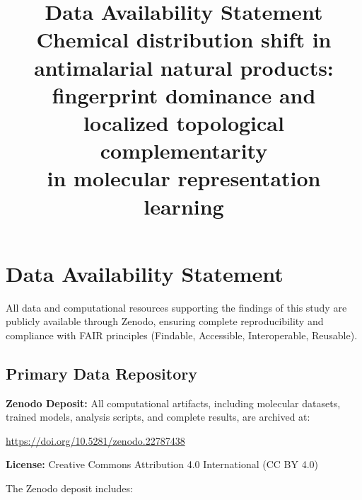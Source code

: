 \documentclass[11pt,a4paper]{article}
\title{Data Availability Statement\\[0.5em]
\large Chemical distribution shift in antimalarial natural products:\\
fingerprint dominance and localized topological complementarity\\
in molecular representation learning}
\author{}
\date{}
\begin{document}
\maketitle

\section*{Data Availability Statement}

All data and computational resources supporting the findings of this study are publicly available through Zenodo, ensuring complete reproducibility and compliance with FAIR principles (Findable, Accessible, Interoperable, Reusable).

\subsection*{Primary Data Repository}

\textbf{Zenodo Deposit:} All computational artifacts, including molecular datasets, trained models, analysis scripts, and complete results, are archived at:

\begin{center}
\url{https://doi.org/10.5281/zenodo.22787438}
\end{center}

\noindent \textbf{License:} Creative Commons Attribution 4.0 International (CC BY 4.0)

\noindent The Zenodo deposit includes:
\end{document}
